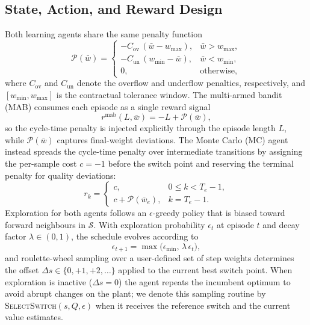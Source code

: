 \documentclass[journal]{IEEEtranTIE}
\begin{document}
\subsection{State, Action, and Reward Design}
Both learning agents share the same penalty function
\begin{equation}
  \mathcal{P}(\bar{w}) =
  \begin{cases}
    -C_{\mathrm{ov}}\,(\bar{w}-w_{\max}), & \bar{w}>w_{\max},\\[2pt]
    -C_{\mathrm{un}}\,(w_{\min}-\bar{w}), & \bar{w}<w_{\min},\\[2pt]
    0, & \text{otherwise},
  \end{cases}
  \label{eq:penalty}
\end{equation}
where $C_{\mathrm{ov}}$ and $C_{\mathrm{un}}$ denote the overflow and underflow penalties, respectively, and $[w_{\min},w_{\max}]$ is the contractual tolerance window. The multi-armed bandit (MAB) consumes each episode as a single reward signal
\begin{equation}
  r^{\mathrm{mab}}(L,\bar{w}) = -L + \mathcal{P}(\bar{w}),
  \label{eq:mab_reward}
\end{equation}
so the cycle-time penalty is injected explicitly through the episode length $L$, while $\mathcal{P}(\bar{w})$ captures final-weight deviations. The Monte Carlo (MC) agent instead spreads the cycle-time penalty over intermediate transitions by assigning the per-sample cost $c=-1$ before the switch point and reserving the terminal penalty for quality deviations:
\begin{equation}
  r_k =
  \begin{cases}
    c, & 0 \le k < T_e-1,\\[2pt]
    c + \mathcal{P}(\bar{w}_e), & k = T_e-1.
  \end{cases}
  \label{eq:step_reward}
\end{equation}
Exploration for both agents follows an $\epsilon$-greedy policy that is biased toward forward neighbours in $\mathcal{S}$. With exploration probability $\epsilon_t$ at episode $t$ and decay factor $\lambda\in(0,1)$, the schedule evolves according to
\begin{equation}
  \epsilon_{t+1} = \max\bigl(\epsilon_{\min},\,\lambda\,\epsilon_t\bigr),
  \label{eq:epsilon_schedule}
\end{equation}
and roulette-wheel sampling over a user-defined set of step weights determines the offset $\Delta s\in\{0,+1,+2,\dots\}$ applied to the current best switch point. When exploration is inactive ($\Delta s=0$) the agent repeats the incumbent optimum to avoid abrupt changes on the plant; we denote this sampling routine by \textsc{SelectSwitch}$(s,Q,\epsilon)$ when it receives the reference switch and the current value estimates.
\end{document}

